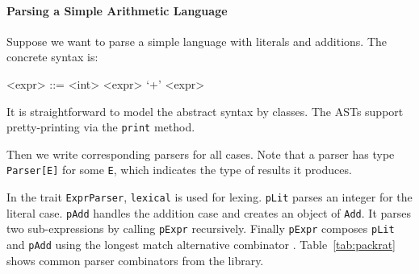 \paragraph{Parsing a Simple Arithmetic Language}
Suppose we want to parse a simple language with literals and
additions. The concrete syntax is:

\setlength{\grammarindent}{5em}
\begin{grammar}
<expr> ::= <int>
    \alt <expr> `+' <expr>
\end{grammar}

It is straightforward to model the abstract syntax by classes. The ASTs support pretty-printing via the \lstinline{print} method.


Then we write corresponding parsers for all cases.
Note that a parser has type \lstinline{Parser[E]} for some
\lstinline{E}, which indicates the type of results it produces.


In the trait \lstinline{ExprParser}, \lstinline{lexical} is used for lexing. \lstinline{pLit} parses an integer for the literal case.
\lstinline{pAdd} handles the addition case and creates an object of \lstinline{Add}. It parses two sub-expressions by calling \lstinline{pExpr}
recursively. Finally \lstinline{pExpr} composes \lstinline{pLit} and \lstinline{pAdd} using the longest match alternative combinator \inlinecode{|||}.
Table~\ref{tab:packrat} shows common parser combinators from the library.


